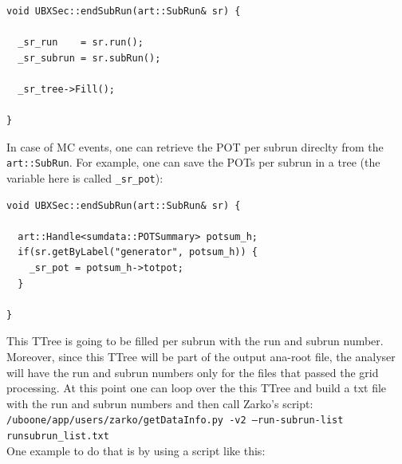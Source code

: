 \documentclass[a4paper, oneside, 12pt, onecolumn]{article}
\begin{document}
\begin{mdframed}[style=exampledefault]%
\begin{lstlisting}[label=some-code]
void UBXSec::endSubRun(art::SubRun& sr) {

  _sr_run    = sr.run();
  _sr_subrun = sr.subRun();
  
  _sr_tree->Fill();

}
\end{lstlisting}
\end{mdframed} 

In case of MC events, one can retrieve the POT per subrun direclty from the \texttt{art::SubRun}. For example, one can save the POTs per subrun in a tree (the variable here is called \texttt{\_sr\_pot}):

\begin{mdframed}[style=exampledefault]%
\begin{lstlisting}[label=some-code]
void UBXSec::endSubRun(art::SubRun& sr) {

  art::Handle<sumdata::POTSummary> potsum_h;
  if(sr.getByLabel("generator", potsum_h)) {
    _sr_pot = potsum_h->totpot;
  }

}
\end{lstlisting}
\end{mdframed}

This TTree is going to be filled per subrun with the run and subrun number. Moreover, since this TTree will be part of the output ana-root file, the analyser will have the run and subrun numbers only for the files that passed the grid processing.
At this point one can loop over the this TTree and build a txt file with the run and subrun numbers and then call Zarko's script:\\

\texttt{/uboone/app/users/zarko/getDataInfo.py -v2 --run-subrun-list runsubrun\_list.txt}\\

One example to do that is by using a script like this:
\end{document}
